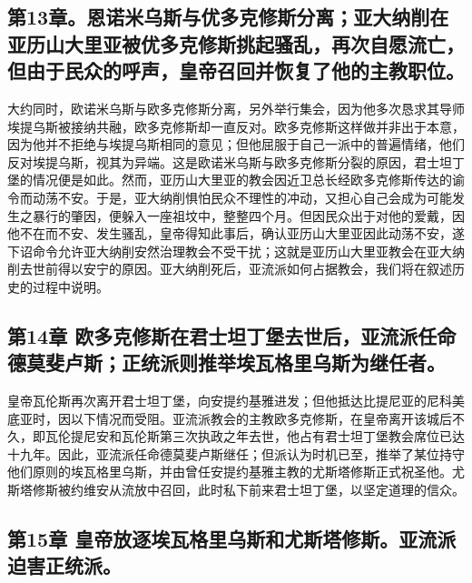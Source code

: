 
\subsection{第13章。恩诺米乌斯与优多克修斯分离；亚大纳削在亚历山大里亚被优多克修斯挑起骚乱，再次自愿流亡，但由于民众的呼声，皇帝召回并恢复了他的主教职位。}

大约同时，欧诺米乌斯与欧多克修斯分离，另外举行集会，因为他多次恳求其导师埃提乌斯被接纳共融，欧多克修斯却一直反对。欧多克修斯这样做并非出于本意，因为他并不拒绝与埃提乌斯相同的意见；但他屈服于自己一派中的普遍情绪，他们反对埃提乌斯，视其为异端。这是欧诺米乌斯与欧多克修斯分裂的原因，君士坦丁堡的情况便是如此。然而，亚历山大里亚的教会因近卫总长经欧多克修斯传达的谕令而动荡不安。于是，亚大纳削惧怕民众不理性的冲动，又担心自己会成为可能发生之暴行的肇因，便躲入一座祖坟中，整整四个月。但因民众出于对他的爱戴，因他不在而不安、发生骚乱，皇帝得知此事后，确认亚历山大里亚因此动荡不安，遂下诏命令允许亚大纳削安然治理教会不受干扰；这就是亚历山大里亚教会在亚大纳削去世前得以安宁的原因。亚大纳削死后，亚流派如何占据教会，我们将在叙述历史的过程中说明。\par


\subsection{第14章 欧多克修斯在君士坦丁堡去世后，亚流派任命德莫斐卢斯；正统派则推举埃瓦格里乌斯为继任者。}

皇帝瓦伦斯再次离开君士坦丁堡，向安提约基雅进发；但他抵达比提尼亚的尼科美底亚时，因以下情况而受阻。亚流派教会的主教欧多克修斯，在皇帝离开该城后不久，即瓦伦提尼安和瓦伦斯第三次执政之年去世，他占有君士坦丁堡教会席位已达十九年。因此，亚流派任命德莫斐卢斯继任；但派认为时机已至，推举了某位持守他们原则的埃瓦格里乌斯，并由曾任安提约基雅主教的尤斯塔修斯正式祝圣他。尤斯塔修斯被约维安从流放中召回，此时私下前来君士坦丁堡，以坚定道理的信众。\par


\subsection{第15章 皇帝放逐埃瓦格里乌斯和尤斯塔修斯。亚流派迫害正统派。}

